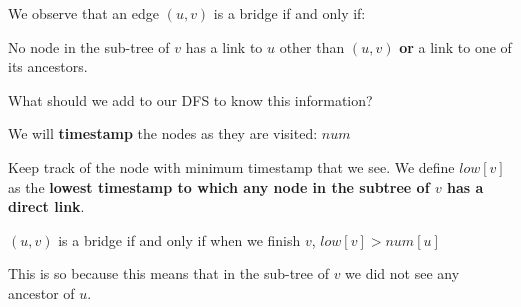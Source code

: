 \documentclass[10pt]{beamer}
\begin{document}


\begin{frame}

We observe that an edge $(u, v)$ is a bridge if and only if:

\vspace{0.5cm}

No node in the sub-tree of $v$ has {\color{cyan} a link to $u$ other than $(u,v)$} \textbf{or} {\color{red} a link to one of its ancestors}.

\vspace{0.5cm}

\begin{center}
\end{center}

What should we add to our DFS to know this information?

\end{frame}


\begin{frame}

We will \textbf{timestamp} the nodes as they are visited: $num$

\vspace{0.5cm}

Keep track of the node with minimum timestamp that we see. We define $low[v]$ as the \textbf{lowest timestamp to which any node in the subtree of $v$ has a direct link}.

\vspace{0.5cm}

$(u, v)$ is a bridge if and only if when we finish $v$, $low[v] > num[u]$

\vspace{0.5cm}

This is so because this means that in the sub-tree of $v$ we did not see any
ancestor of $u$.

\end{frame}
\end{document}

